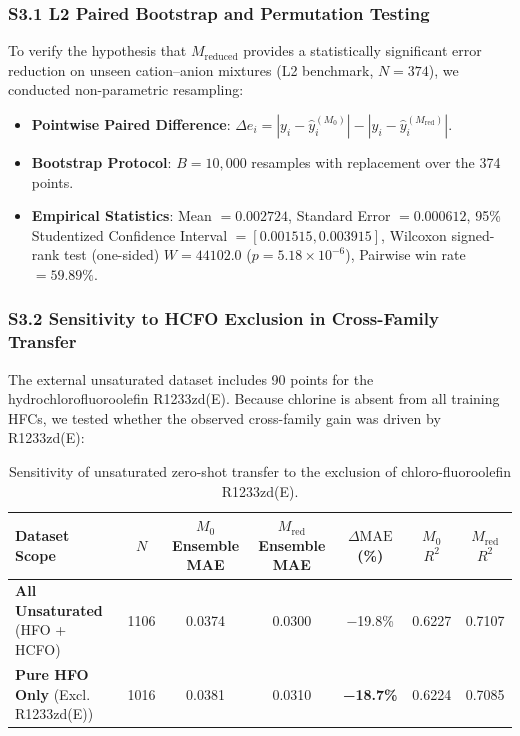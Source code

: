 \subsubsection*{S3.1 L2 Paired Bootstrap and Permutation Testing}
To verify the hypothesis that $M_{\mathrm{reduced}}$ provides a statistically significant error reduction on unseen cation--anion mixtures (L2 benchmark, $N=374$), we conducted non-parametric resampling:
\begin{itemize}
    \item \textbf{Pointwise Paired Difference}: $\Delta e_i = |y_i - \hat{y}_i^{(M_0)}| - |y_i - \hat{y}_i^{(M_{\mathrm{red}})}|$.
    \item \textbf{Bootstrap Protocol}: $B = 10,000$ resamples with replacement over the 374 points.
    \item \textbf{Empirical Statistics}: Mean $= 0.002724$, Standard Error $= 0.000612$, 95\% Studentized Confidence Interval $= [0.001515, 0.003915]$, Wilcoxon signed-rank test (one-sided) $W = 44102.0$ ($p = 5.18 \times 10^{-6}$), Pairwise win rate $= 59.89\%$.
\end{itemize}

\subsubsection*{S3.2 Sensitivity to HCFO Exclusion in Cross-Family Transfer}
The external unsaturated dataset includes 90 points for the hydrochlorofluoroolefin R1233zd(E). Because chlorine is absent from all training HFCs, we tested whether the observed cross-family gain was driven by R1233zd(E):

\begin{table}[htbp]
\centering
\small
\caption{Sensitivity of unsaturated zero-shot transfer to the exclusion of chloro-fluoroolefin R1233zd(E).}
\label{tab:si_hcfo_sensitivity}
\begin{tabular}{lcccccc}
\toprule
\textbf{Dataset Scope} & \textbf{$N$} & \textbf{$M_0$ Ensemble MAE} & \textbf{$M_{\mathrm{red}}$ Ensemble MAE} & \textbf{$\Delta\text{MAE}$ (\%)} & \textbf{$M_0$ $R^2$} & \textbf{$M_{\mathrm{red}}$ $R^2$} \\
\midrule
\textbf{All Unsaturated} (HFO + HCFO) & 1106 & 0.0374 & 0.0300 & −19.8\% & 0.6227 & 0.7107 \\
\textbf{Pure HFO Only} (Excl. R1233zd(E)) & 1016 & 0.0381 & 0.0310 & \textbf{−18.7\%} & 0.6224 & 0.7085 \\
\bottomrule
\end{tabular}
\end{table}

